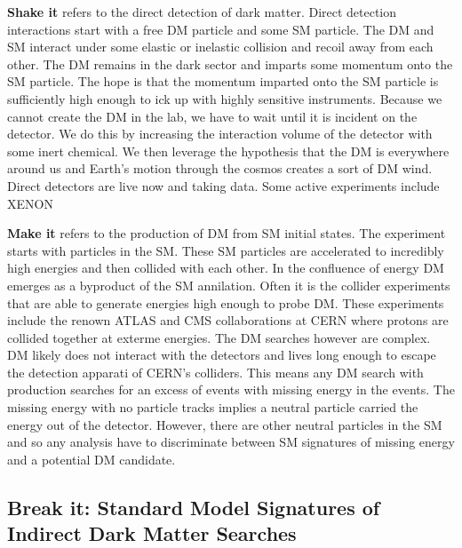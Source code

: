\textbf{Shake it} refers to the direct detection of dark matter.
Direct detection interactions start with a free DM particle and some SM particle.
The DM and SM interact under some elastic or inelastic collision and recoil away from each other.
The DM remains in the dark sector and imparts some momentum onto the SM particle.
The hope is that the momentum imparted onto the SM particle is sufficiently high enough to ick up with highly sensitive instruments.
Because we cannot create the DM in the lab, we have to wait until it is incident on the detector.
We do this by increasing the interaction volume of the detector with some inert chemical.
We then leverage the hypothesis that the DM is everywhere around us and Earth's motion through the cosmos creates a sort of DM wind.
Direct detectors are live now and taking data.
Some active experiments include XENON 


\textbf{Make it} refers to the production of DM from SM initial states.
The experiment starts with particles in the SM.
These SM particles are accelerated to incredibly high energies and then collided with each other.
In the confluence of energy DM emerges as a byproduct of the SM annilation.
Often it is the collider experiments that are able to generate energies high enough to probe DM.
These experiments include the renown ATLAS and CMS collaborations at CERN where protons are collided together at exterme energies.
The DM searches however are complex.
DM likely does not interact with the detectors and lives long enough to escape the detection apparati of CERN's colliders.
This means any DM search with production searches for an excess of events with missing energy in the events.
The missing energy with no particle tracks implies a neutral particle carried the energy out of the detector.
However, there are other neutral particles in the SM and so any analysis have to discriminate between SM signatures of missing energy and a potential DM candidate.


\subsection{Break it: Standard Model Signatures of Indirect Dark Matter Searches\label{sec:break_it}}

